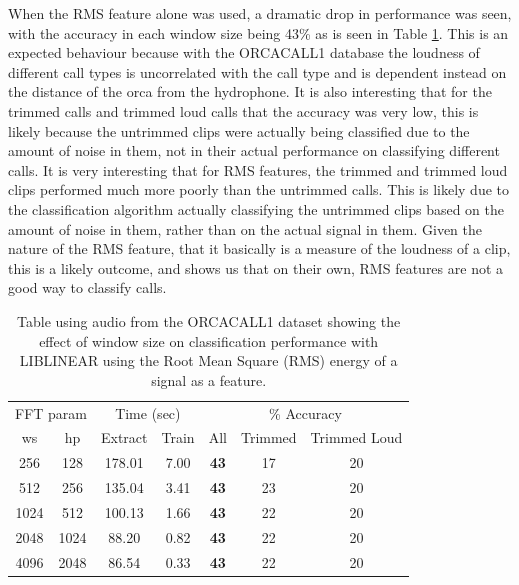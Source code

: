 When the RMS feature alone was used, a dramatic drop in performance
was seen, with the accuracy in each window size being 43\% as is seen
in Table \ref{table:calls-different-rms}.  This is an expected
behaviour because with the ORCACALL1 database the loudness of
different call types is uncorrelated with the call type and is
dependent instead on the distance of the orca from the hydrophone.  It
is also interesting that for the trimmed calls and trimmed loud calls
that the accuracy was very low, this is likely because the untrimmed
clips were actually being classified due to the amount of noise in
them, not in their actual performance on classifying different calls.
It is very interesting that for RMS features, the trimmed and trimmed
loud clips performed much more poorly than the untrimmed calls.  This
is likely due to the classification algorithm actually classifying the
untrimmed clips based on the amount of noise in them, rather than on
the actual signal in them.  Given the nature of the RMS feature, that
it basically is a measure of the loudness of a clip, this is a likely
outcome, and shows us that on their own, RMS features are not a good
way to classify calls.

\begin{table}
\begin{tabular}{|c|c|c|c|c|c|c|}
\hline
\multicolumn{2}{|c|}{FFT param} & \multicolumn{2}{c|}{Time (sec)} & \multicolumn{3}{c|}{\% Accuracy} \\
\hhline{|-|-|-|-|-|-|-|}
ws & hp & Extract & Train & All & Trimmed & Trimmed Loud \\
\hhline{|=|=|=|=|=|=|=|}
256 & 128        &   178.01  &    7.00  &    \textbf{43}  & 17 & 20 \\
512 & 256        &   135.04  &    3.41  &    \textbf{43}  & 23 & 20 \\
1024 & 512       &   100.13  &    1.66  &    \textbf{43}  & 22 & 20 \\
2048 & 1024      &    88.20  &    0.82  &    \textbf{43}  & 22 & 20  \\
4096 & 2048      &    86.54  &    0.33  &    \textbf{43}  & 22 & 20 \\
\hline
\end{tabular}
\caption{Table using audio from the ORCACALL1 dataset showing the
  effect of window size on classification performance with LIBLINEAR
  using the Root Mean Square (RMS) energy of a signal as a feature.}
\label{table:calls-different-rms}
\end{table}

